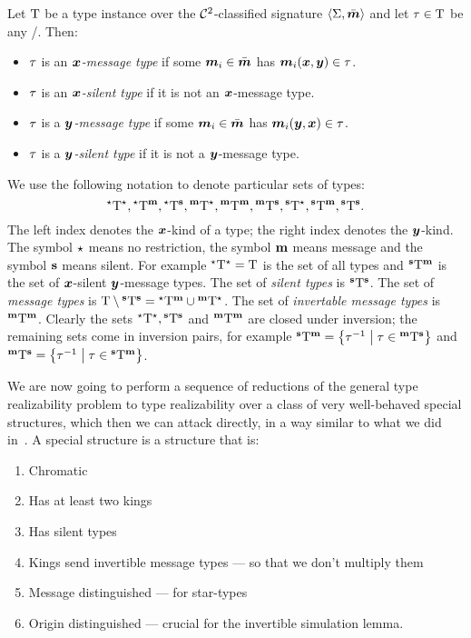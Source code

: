 \begin{definition}
Let $\TI$ be a type instance over the $\vFoc2$-classified signature
$\ClSig\SigS\sms$ and let $\tpt\in\TI$ be any \twotype/.
Then:
\begin{itemize}
  \item 
  $\tpt$ is an \emph{$\xx$-message type} if some $\smm\ii\in\sms$
  has $\smm\ii(\xx,\yy)\in\tpt$.
  \item
  $\tpt$ is an \emph{$\xx$-silent type} if it is not an $\xx$-message type.
  \item
  $\tpt$ is a \emph{$\yy$-message type} if some $\smm\ii\in\sms$
  has $\smm\ii(\yy,\xx)\in\tpt$.
  \item
  $\tpt$ is a \emph{$\yy$-silent type} if it is not a $\yy$-message type.
\end{itemize}

We use the following notation to denote particular sets of types:
\[
  \TIall.
\]
The left index denotes the $\xx$-kind of a type;
the right index denotes the $\yy$-kind.
The symbol $\arn$ means no restriction, the symbol $\arm$ means message and the
symbol $\ars$ means silent.
For example $\TIann = \TI$ is the set of all types and $\TIasm$ is the set of
$\xx$-silent $\yy$-message types.
The set of \emph{silent types} is $\TIass$.
The set of \emph{message types} is $\TI\sub\TIass = \TIanm\cup\TIamn$.
The set of \emph{invertable message types} is $\TIamm$.
Clearly the sets $\TIann, \TIass$ and $\TIamm$ are closed under inversion;
the remaining sets come in inversion pairs, for example
$\TIasm = \setbd{\inv\tpt}{\tpt\in\TIams}$ and 
$\TIams = \setbd{\inv\tpt}{\tpt\in\TIasm}$.
\end{definition}
We are now going to perform a sequence of reductions of the general type
realizability problem to type realizability over a class of very well-behaved
special structures, which then we can attack directly, in a way similar to what
we did in~.
A special structure is a structure that is:
\begin{enumerate}
  \item Chromatic
  \item Has at least two kings
  \item Has silent types
  \item Kings send invertible message types --- so that we don't multiply them
  \item Message distinguished --- for star-types
  \item Origin distinguished --- crucial for the invertible simulation lemma.
\end{enumerate}

